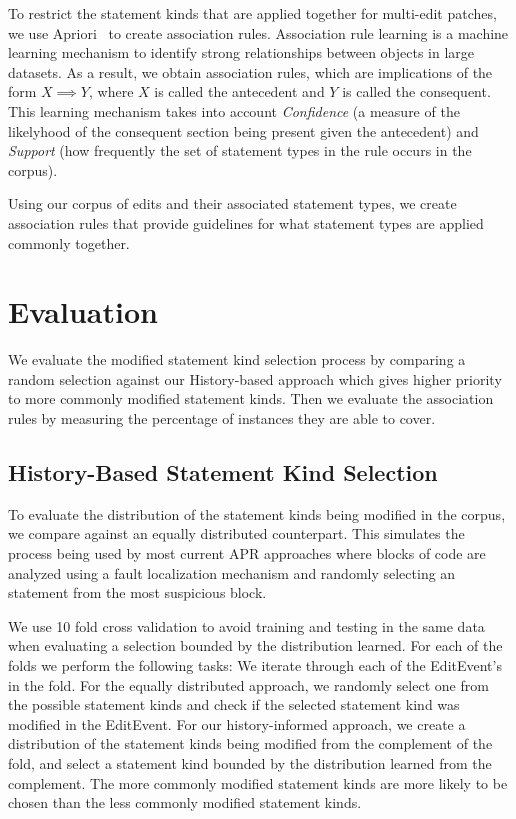 \documentclass[sigconf]{acmart}
\begin{document}
To restrict the statement kinds that are applied together for 
multi-edit patches, we use Apriori~\cite{Agrawal94} to create
association rules.
Association rule learning is a machine learning mechanism to identify
strong relationships between objects in large datasets. 
As a result, we obtain association rules, which are implications of the
form $X \implies Y$, where $X$ is called the antecedent and 
$Y$ is called the consequent.
This learning mechanism takes into 
account \textit{Confidence} (a measure of the likelyhood 
of the consequent section being present given the 
antecedent) and \textit{Support} (how frequently the set of
statement types in the rule occurs in the corpus).

Using our corpus of edits and their associated statement types, 
we create association rules that provide guidelines
for what statement types are applied commonly together. 

\section{Evaluation}
\label{eval}
We evaluate the modified statement kind selection process
by comparing a random selection against our History-based 
approach which gives higher priority to more commonly 
modified statement kinds. Then we evaluate the association
rules by measuring the percentage of instances they are able to 
cover.

\subsection{History-Based Statement Kind Selection}
To evaluate the distribution of the statement kinds being modified
in the corpus, we compare against an equally distributed counterpart.
This simulates the process being used by most current APR approaches
where blocks of code are analyzed using a fault localization 
mechanism and randomly selecting an statement from the most
suspicious block.

We use 10 fold
cross validation to avoid training and testing in the same data
when evaluating a selection bounded by the distribution
learned. For each of the folds we perform the following
tasks:
We iterate through each of the EditEvent's in the fold. For
the equally distributed approach, we randomly select one from 
the possible statement kinds and check if the selected
statement kind was modified in the EditEvent.
For our history-informed approach, we create a distribution
of the statement kinds being modified from the complement of the fold, 
and select a statement
kind bounded by the distribution 
learned from the complement. The more commonly modified statement
kinds are more likely to be chosen than the less commonly modified
statement kinds.
\end{document}
